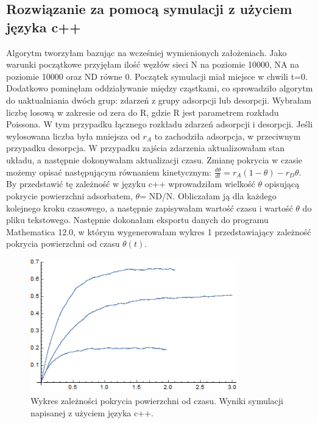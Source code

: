 \documentclass[]{report}
\begin{document}
\subsection{Rozwiązanie za pomocą symulacji z użyciem języka c++}
Algorytm tworzyłam bazując na wcześniej wymienionych założeniach. Jako warunki początkowe przyjęłam ilość węzłów sieci N na poziomie 10000, NA na poziomie 10000 oraz ND równe 0. Początek symulacji miał miejsce w chwili t=0. Dodatkowo pominęłam oddziaływanie między cząstkami, co sprowadziło algorytm do  uaktualniania dwóch grup: zdarzeń z grupy adsorpcji lub desorpcji. Wybrałam liczbę losową w zakresie od zera do R, gdzie R jest parametrem rozkładu Poissona. W tym przypadku łącznego rozkładu zdarzeń adsorpcji i desorpcji.  Jeśli wylosowana liczba była mniejsza od $r_A$ to zachodziła adsorpcja, w przeciwnym przypadku desorpcja. W przypadku zajścia zdarzenia aktualizowałam stan układu, a następnie dokonywałam aktualizacji czasu. Zmianę pokrycia w czasie możemy opisać następującym równaniem kinetycznym:
$\frac{d \theta}{d t}=r_{A}(1-\theta)-r_{D} \theta$.
By przedstawić tę zależność w języku c++ wprowadziłam wielkość $\theta$ opisującą pokrycie powierzchni adsorbatem, $\theta$= ND/N. Obliczałam ją dla każdego kolejnego kroku czasowego, a następnie zapisywałam wartość czasu i wartość $\theta$ do pliku tekstowego. Następnie dokonałam eksportu danych do programu Mathematica 12.0, w którym wygenerowałam wykres 1 przedstawiający zależność pokrycia powierzchni od czasu $\theta (t)$. 
\begin{figure}
	\includegraphics[width=0.8\textwidth]{Wykres1.png}
	\caption{Wykres zależności pokrycia powierzchni od czasu. Wyniki symulacji napisanej z użyciem języka c++.}
	\label{fig:W1}
\end{figure}
\end{document}
